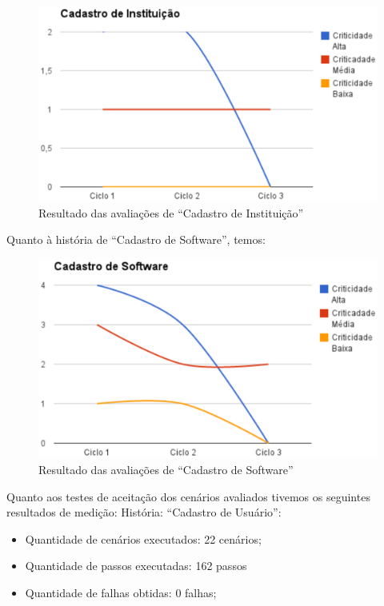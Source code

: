 \begin{figure}[h!]
    	\centering
    	\includegraphics[keepaspectratio=true,scale=0.62]
      		{figuras/graf02.eps}
    	\caption{Resultado das avaliações de ``Cadastro de Instituição''}
    	\label{avaliacaoinstitucion}
\end{figure}

Quanto à história de ``Cadastro de  Software'', temos:

\begin{figure}[h!]
    	\centering
    	\includegraphics[keepaspectratio=true,scale=0.62]
      		{figuras/graf03.eps}
    	\caption{Resultado das avaliações de ``Cadastro de Software''}
    	\label{avaliacaosoftware}
\end{figure}

\newpage
Quanto aos testes de aceitação dos cenários avaliados tivemos os seguintes resultados de medição:
História: ``Cadastro de Usuário'':
\begin{itemize}
	\item Quantidade de cenários executados: 22 cenários;
	\item Quantidade de passos executadas: 162 passos
	\item Quantidade de falhas obtidas: 0 falhas;
\end{itemize} 

